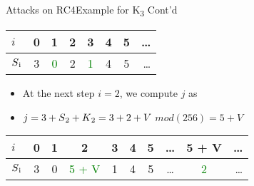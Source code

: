 \documentclass[
	aspectratio=169,	%
	onlytextwidth,		%
	t,					%
	]{beamer}
\begin{document}
\begin{frame}[fragile]{Attacks on RC4}{Example for K\textsubscript{3} Cont'd}

	\begin{table}[h!]
		\begin{center}
			\label{tab:table3}
			\begin{tabular}{l|c|c|c|c|c|c|r}
			$i$ & 0 & 1 & 2 & 3 & 4 & 5 & \dots\\
			\hline
			$S\textsubscript{i}$ & 3 & \textcolor{green}{0} & 2 & \textcolor{green}{1} & 4 & 5 & \dots\\
			\end{tabular}
		\end{center}
	\end{table}

	\begin{itemize}
		\item At the next step $i = 2$, we compute $j$ as
		\item $j = 3 + S\textsubscript{2} + K\textsubscript{2} = 3 + 2 + V$ $mod(256) = 5+V$
	\end{itemize}

	\begin{table}[h!]
		\begin{center}
			\label{tab:table4}
			\begin{tabular}{l|c|c|c|c|c|c|c|c|r}
			$i$ & 0 & 1 & 2 & 3 & 4 & 5 & \dots & 5 + V & \dots\\
			\hline
			$S\textsubscript{i}$ & 3 & 0 & \textcolor{green}{5 + V} & 1 & 4 & 5 & \dots & \textcolor{green}{2} & \dots\\
			\end{tabular}
		\end{center}
	\end{table}

\end{frame}
\end{document}
